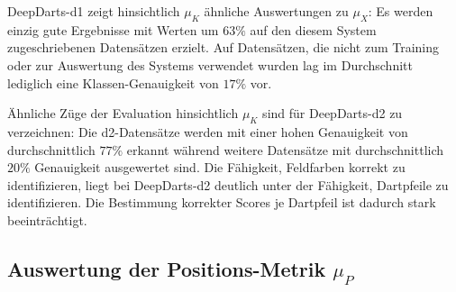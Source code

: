 DeepDarts-d1 zeigt hinsichtlich $\mu_K$ ähnliche Auswertungen zu $\mu_X$: Es werden einzig gute Ergebnisse mit Werten um $63\%$ auf den diesem System zugeschriebenen Datensätzen erzielt. Auf Datensätzen, die nicht zum Training oder zur Auswertung des Systems verwendet wurden lag im Durchschnitt lediglich eine Klassen-Genauigkeit von $17\%$ vor.

Ähnliche Züge der Evaluation hinsichtlich $\mu_K$ sind für DeepDarts-d2 zu verzeichnen: Die d2-Datensätze werden mit einer hohen Genauigkeit von durchschnittlich $77\%$ erkannt während weitere Datensätze mit durchschnittlich $20\%$ Genauigkeit ausgewertet sind. Die Fähigkeit, Feldfarben korrekt zu identifizieren, liegt bei DeepDarts-d2 deutlich unter der Fähigkeit, Dartpfeile zu identifizieren. Die Bestimmung korrekter Scores je Dartpfeil ist dadurch stark beeinträchtigt.


\subsection{Auswertung der Positions-Metrik \texorpdfstring{$\mu_P$}{µ\_P}}
\label{sec:auswertung_pos}

\NNPos

